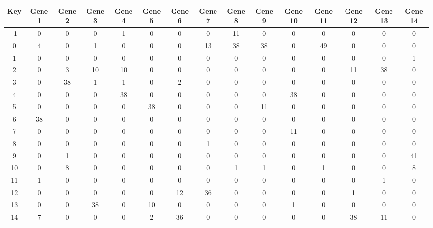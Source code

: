 \begin{tabular}{|c|c|c|c|c|c|c|c|c|c|c|c|c|c|c|}
\hline
Key & Gene 1 & Gene 2 & Gene 3 & Gene 4 & Gene 5 & Gene 6 & Gene 7 & Gene 8 & Gene 9 & Gene 10 & Gene 11 & Gene 12 & Gene 13 & Gene 14 \\
\hline
-1 & 0 & 0 & 0 & 1 & 0 & 0 & 0 & 11 & 0 & 0 & 0 & 0 & 0 & 0 \\
0 & 4 & 0 & 1 & 0 & 0 & 0 & 13 & 38 & 38 & 0 & 49 & 0 & 0 & 0 \\
1 & 0 & 0 & 0 & 0 & 0 & 0 & 0 & 0 & 0 & 0 & 0 & 0 & 0 & 1 \\
2 & 0 & 3 & 10 & 10 & 0 & 0 & 0 & 0 & 0 & 0 & 0 & 11 & 38 & 0 \\
3 & 0 & 38 & 1 & 1 & 0 & 2 & 0 & 0 & 0 & 0 & 0 & 0 & 0 & 0 \\
4 & 0 & 0 & 0 & 38 & 0 & 0 & 0 & 0 & 0 & 38 & 0 & 0 & 0 & 0 \\
5 & 0 & 0 & 0 & 0 & 38 & 0 & 0 & 0 & 11 & 0 & 0 & 0 & 0 & 0 \\
6 & 38 & 0 & 0 & 0 & 0 & 0 & 0 & 0 & 0 & 0 & 0 & 0 & 0 & 0 \\
7 & 0 & 0 & 0 & 0 & 0 & 0 & 0 & 0 & 0 & 11 & 0 & 0 & 0 & 0 \\
8 & 0 & 0 & 0 & 0 & 0 & 0 & 1 & 0 & 0 & 0 & 0 & 0 & 0 & 0 \\
9 & 0 & 1 & 0 & 0 & 0 & 0 & 0 & 0 & 0 & 0 & 0 & 0 & 0 & 41 \\
10 & 0 & 8 & 0 & 0 & 0 & 0 & 0 & 1 & 1 & 0 & 1 & 0 & 0 & 8 \\
11 & 1 & 0 & 0 & 0 & 0 & 0 & 0 & 0 & 0 & 0 & 0 & 0 & 1 & 0 \\
12 & 0 & 0 & 0 & 0 & 0 & 12 & 36 & 0 & 0 & 0 & 0 & 1 & 0 & 0 \\
13 & 0 & 0 & 38 & 0 & 10 & 0 & 0 & 0 & 0 & 1 & 0 & 0 & 0 & 0 \\
14 & 7 & 0 & 0 & 0 & 2 & 36 & 0 & 0 & 0 & 0 & 0 & 38 & 11 & 0 \\
\hline
\end{tabular}